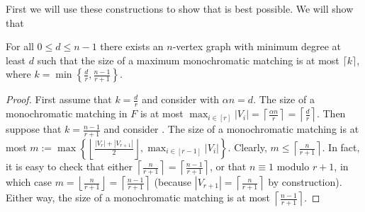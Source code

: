 \documentclass[10pt,a4paper,reqno]{amsart}
\begin{document}
First we will use these constructions to show that  is best possible. We will show that 
\begin{proposition}
For all $0 \le d \le n-1$ there exists an $n$-vertex graph with minimum degree at least $d$ such that the size of a maximum monochromatic matching is at most $\lceil k \rceil$, where $k = \min\left\{ \frac{d}{r}, \frac{n-1}{r+1}\right\}$. 
\end{proposition}
\begin{proof}
First assume that $k = \frac{d}{r}$  and consider  with $\alpha n = d$. The size of a monochromatic matching in $F$ is at most $\max_{i \in [r]}|V_i| = \left\lceil\frac{\alpha n}{r}\right\rceil = \left\lceil\frac{d}{r}\right\rceil$. Then suppose that $ k = \frac{n-1}{r+1}$ and consider . The size of a monochromatic matching is at most $m:=\max\left\{\left\lfloor\frac{|V_r| + |V_{r+1}|}{2}\right\rfloor, \max_{i \in [r-1]}|V_i|\right\}$. Clearly, $m \le \left\lceil\frac{n}{r+1}\right\rceil$. In fact, it is easy to check that either $\left\lceil\frac{n}{r+1}\right\rceil = \left\lceil\frac{n-1}{r+1}\right\rceil$, or that $n\equiv 1$ modulo ${r+1}$, in which case $m = \left\lfloor\frac{n}{r+1}\right\rfloor = \left\lceil\frac{n-1}{r+1}\right\rceil$ (because $|V_{r + 1}| = \left\lceil\frac{n}{r + 1}\right\rceil$ by construction). Either way, the size of a monochromatic matching is at most $\left\lceil\frac{n-1}{r+1}\right\rceil$.
\end{proof}
\end{document}
